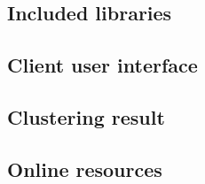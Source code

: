 \subsection{Included libraries}
    

\subsection{Client user interface}

    
    

\subsection{Clustering result}
    

\subsection{Online resources}
    
